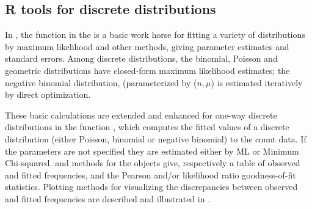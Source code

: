 \documentclass[11pt]{book}\usepackage[]{graphicx}\usepackage[]{color}
\begin{document}
\subsection{R tools for discrete distributions}\label{sec:fitdistr}
In \R, the function  in the 
is a basic work horse for fitting a variety of distributions
by maximum likelihood and other methods, giving parameter estimates
and standard errors.
Among discrete distributions, the binomial,
Poisson and geometric distributions have closed-form 
maximum likelihood estimates; the negative binomial distribution,
(parameterized by ($n, \mu$) is estimated iteratively by direct
optimization.

These basic calculations are extended and enhanced for one-way
discrete distributions in the  function
, which 
computes the fitted values of a discrete distribution (either Poisson, binomial or negative binomial) to the count data. 
If the parameters are not specified they are estimated either by ML or Minimum Chi-squared.  and  methods for
the  objects give, respectively a table of
observed and fitted frequencies, and the Pearson and/or likelihood
ratio goodness-of-fit statistics. Plotting methods for visualizing
the discrepancies between observed and fitted frequencies are
described and illustrated in .
\end{document}
